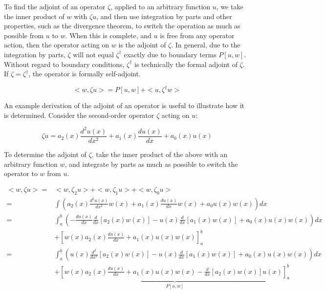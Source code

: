 \documentclass[10pt]{article}
\begin{document}
\begin{flushleft}
To find the adjoint of an operator \(\zeta\), applied to an arbitrary function \(u\), we take the inner product of \(w\) with \(\zeta u\), and then use integration by parts and other properties, such as the divergence theorem, to switch the operation as much as possible from \(u\) to \(w\). When this is complete, and \(u\) is free from any operator action, then the operator acting on \(w\) is the adjoint of \(\zeta\). In general, due to the integration by parts, \(\zeta\) will not equal \(\zeta^\dagger\) exactly due to boundary terms \(P[u,w]\). Without regard to boundary conditions, \(\zeta^\dagger\) is technically the formal adjoint of \(\zeta\). If \(\zeta=\zeta^\dagger\), the operator is formally self-adjoint.

\begin{equation}
\label{eq:FormalAdjointDefinition}
<w, \zeta u> = P[u,w] + <u, \zeta^\dagger w>
\end{equation}

\begin{tcolorbox}[breakable]
An example derivation of the adjoint of an operator is useful to illustrate how it is determined. Consider the second-order operator \(\zeta\) acting on \(u\):

\begin{equation}
\zeta u=a_2(x)\frac{d^2u(x)}{dx^2}+a_1(x)\frac{du(x)}{dx}+a_0(x)u(x)
\end{equation}

To determine the adjoint of \(\zeta\), take the inner product of the above with an arbitrary function \(w\), and integrate by parts as much as possible to switch the operator to \(w\) from \(u\).

\begin{equation}
\begin{aligned}
<w,\zeta u> = & <w, \zeta_2 u> + <w, \zeta_1 u> + <w, \zeta_0 u>\\
= & \int \left(a_2(x)\frac{d^2u(x)}{dx^2}w(x)+a_1(x)\frac{du(x)}{dx}w(x)+a_0u(x)w(x)\right)dx\\
= & \int_a^b \left(-\frac{du(x)}{dx}\frac{d}{dx}\left\lbrack a_2(x)w(x)\right\rbrack -u(x)\frac{d}{dx}\left\lbrack a_1(x)w(x)\right\rbrack + a_0(x)u(x)w(x)\right) dx\\ 
& + \left\lbrack w(x)a_2(x)\frac{du(x)}{dx}+a_1(x)u(x)w(x)\right\rbrack_a^b\\
= & \int_a^b \left(u(x)\frac{d^2}{dx^2}\left\lbrack a_2(x)w(x)\right\rbrack-u(x)\frac{d}{dx}\left\lbrack a_1(x)w(x)\right\rbrack + a_0(x)u(x)w(x)\right)dx\\
& + \underbrace{\left\lbrack w(x)a_2(x)\frac{du(x)}{dx}+a_1(x)u(x)w(x)-\frac{d}{dx}\left\lbrack a_2(x)w(x)\right\rbrack u(x)\right\rbrack_a^b}_{P[u,w]}\\
\end{aligned}
\end{equation}


\end{tcolorbox}
\end{flushleft}
\end{document}
